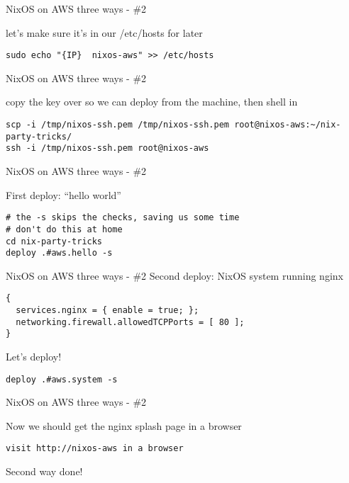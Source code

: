 \documentclass[bigger]{beamer}
\begin{document}
\begin{frame}[label={sec:org4d0a55a},fragile]{NixOS on AWS three ways - \#2}
 \begin{exampleblock}{let's make sure it's in our /etc/hosts for later}
\begin{verbatim}
sudo echo "{IP}  nixos-aws" >> /etc/hosts
\end{verbatim}
\end{exampleblock}
\end{frame}
\begin{frame}[label={sec:org31e01c9},fragile]{NixOS on AWS three ways - \#2}
 \begin{exampleblock}{copy the key over so we can deploy from the machine, then shell in}
\begin{verbatim}
scp -i /tmp/nixos-ssh.pem /tmp/nixos-ssh.pem root@nixos-aws:~/nix-party-tricks/
ssh -i /tmp/nixos-ssh.pem root@nixos-aws
\end{verbatim}
\end{exampleblock}
\end{frame}
\begin{frame}[label={sec:org6815946},fragile]{NixOS on AWS three ways - \#2}
 \begin{exampleblock}{First deploy: ``hello world''}
\begin{verbatim}
# the -s skips the checks, saving us some time
# don't do this at home
cd nix-party-tricks
deploy .#aws.hello -s
\end{verbatim}
\end{exampleblock}
\end{frame}
\begin{frame}[label={sec:org93d2c66},fragile]{NixOS on AWS three ways - \#2}
 Second deploy: NixOS system running nginx
\begin{verbatim}
{
  services.nginx = { enable = true; };
  networking.firewall.allowedTCPPorts = [ 80 ];
}
\end{verbatim}
\begin{exampleblock}{Let's deploy!}
\begin{verbatim}
deploy .#aws.system -s
\end{verbatim}
\end{exampleblock}
\end{frame}
\begin{frame}[label={sec:orgd014b45},fragile]{NixOS on AWS three ways - \#2}
 \begin{exampleblock}{Now we should get the nginx splash page in a browser}
\begin{verbatim}
visit http://nixos-aws in a browser
\end{verbatim}

Second way done!
\end{exampleblock}
\end{frame}
\end{document}
